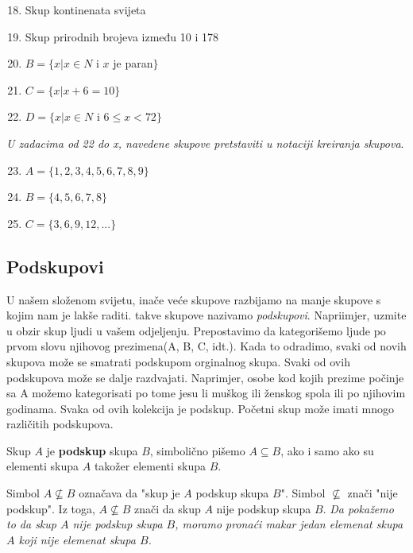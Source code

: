 \documentclass[a4paper,14pt,svgnames]{article}
\newcounter{counter}
\begin{document}
\begin{tcolorbox}[title=\textbf{ZADACI ZA VJEŽBU}]
\begin{minipage}{0.5\textwidth}
\begin{enumerate}
\setcounter{enumi}{17}
\item Skup kontinenata svijeta
\item Skup prirodnih brojeva između 10 i 178
\item $B=\{x|x\in N$ i $x$ je paran$\}$
\item $C=\{x|x+6=10\}$
\item $D=\{x|x\in N$ i $6\leqslant x < 72\}$
\end{enumerate}
\textit{U zadacima od 22 do x, navedene skupove pretstaviti u notaciji kreiranja skupova}.
\begin{enumerate}
\setcounter{enumi}{22}
\item $A=\{1, 2, 3, 4, 5, 6, 7, 8, 9\}$
\item $B=\{4, 5, 6, 7, 8\}$
\item $C=\{3, 6, 9, 12, ...\}$
\end{enumerate}
\end{minipage}
\end{tcolorbox}

\newpage
\subsection{Podskupovi}
\bigskip\bigskip
U našem složenom svijetu, inače veće skupove razbijamo na manje skupove s kojim nam je lakše raditi. takve skupove nazivamo \textit{podskupovi}. Napriimjer, uzmite u obzir skup ljudi u vašem odjeljenju. Prepostavimo da kategorišemo ljude po prvom slovu njihovog prezimena(A, B, C, idt.). Kada to odradimo, svaki od novih skupova može se smatrati podskupom orginalnog skupa. Svaki od ovih podskupova može se dalje  razdvajati. Naprimjer, osobe kod kojih prezime počinje sa A možemo kategorisati po tome jesu li muškog ili ženskog spola ili po njihovim godinama. Svaka od ovih kolekcija je podskup. Početni skup može imati mnogo različitih podskupova.\smallskip

\begin{tcolorbox}
Skup $A$ je \textbf{podskup} skupa $B$, simbolično pišemo $A\subseteq B$, ako i samo ako su elementi skupa $A$ takožer elementi skupa $B$.
\end{tcolorbox}\medskip

Simbol $A\nsubseteq B$ označava da "skup je $A$ podskup skupa $B$". Simbol $\nsubseteq$ znači "nije podskup". Iz toga, $A\nsubseteq B$ znači da skup $A$ nije podskup skupa $B$. \textit{Da pokažemo to da skup $A$ nije podskup skupa $B$, moramo pronaći makar jedan elemenat skupa $A$ koji nije elemenat skupa $B$.}\medskip
\end{document}
